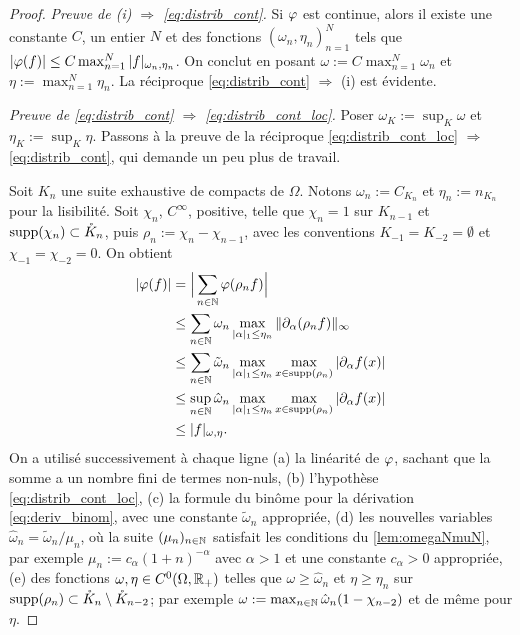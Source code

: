 \begin{proof}
\emph{Preuve de (i) $\Rightarrow$ \eqref{eq:distrib_cont}.}
 Si $\varphi$ est continue, alors il existe  une constante $C$, un entier $N$ et des fonctions $(\omega_n,\eta_n)_{n=1}^N$ tels que $|\varphi(f)|\leq C \max_{n=1}^N |f|_{\omega_n,\eta_n}$. On conclut en posant $\omega := C\max_{n=1}^N \omega_n$ et $\eta := \max_{n=1}^N \eta_n$.
	La réciproque \eqref{eq:distrib_cont} $\Rightarrow$ (i) est évidente. 

\emph{Preuve de \eqref{eq:distrib_cont} $\Rightarrow$ \eqref{eq:distrib_cont_loc}.} Poser $\omega_K := \sup_K \omega$ et $\eta_K:=\sup_K \eta$. Passons à la preuve de la réciproque \eqref{eq:distrib_cont_loc} $\Rightarrow$ \eqref{eq:distrib_cont}, qui demande un peu plus de travail.  

Soit $K_n$ une suite exhaustive de compacts de $\Omega$.	
Notons $\omega_n := C_{K_n}$ et $\eta_n := n_{K_n}$ pour la lisibilité. 	Soit $\chi_n$, $C^\infty$, positive, telle que $\chi_n=1$ sur $K_{n-1}$ et $\operatorname{supp}(\chi_n) \subset \mathring K_n$, puis $\rho_n := \chi_n - \chi_{n-1}$, avec les conventions $K_{-1} = K_{-2} = \emptyset$ et $\chi_{-1} = \chi_{-2} =0$.
	On obtient
	\begin{align*}
		|\vp(f)| &= \Big| \sum_{n \in \bN} \vp(\rho_n f) \Big|\\
		&\leq \sum_{n\in \bN} \omega_n \max_{|\alpha|_1 \leq \eta_n} \|\partial_\alpha (\rho_n f)\|_\infty\\
		&\leq \sum_{n \in \bN} \tilde \omega_n \max_{|\alpha|_1 \leq \eta_n} \max_{x \in \supp(\rho_n) }|\partial_\alpha f(x)|\\
		&\leq \sup_{n \in \bN} \hat \omega_n \max_{|\alpha|_1 \leq \eta_n} %
		\max_{x \in \supp(\rho_n) }|\partial_\alpha f(x)|\\
		& \leq |f|_{\omega,\eta}.
	\end{align*}
	On a utilisé successivement à chaque ligne (a) la linéarité de $\varphi$, sachant que la somme a un nombre fini de termes non-nuls, (b) l'hypothèse \eqref{eq:distrib_cont_loc}, (c) la formule du binôme pour la dérivation \eqref{eq:deriv_binom}, avec une constante $\tilde \omega_n$ appropriée, (d) les nouvelles variables $\hat \omega_n = \tilde \omega_n /\mu_n$, où la suite $(\mu_n)_{n \in \mathbb{N}}$ satisfait les conditions du \cref{lem:omegaNmuN}, par exemple $\mu_n := c_\alpha (1+n)^{-\alpha}$ avec $\alpha>1$ et une constante $c_\alpha>0$ appropriée, (e) des fonctions $\omega,\eta \in C^0(\Omega,\mathbb{R}_+)$ telles que $\omega \geq \hat \omega_n$ et $\eta \geq \eta_n$ sur $\operatorname{supp}(\rho_n)\subset \mathring K_n \setminus \mathring K_{n-2}$; par exemple $\omega := \max_{n\in \mathbb{N}} \hat \omega_n (1-\chi_{n-2})$ et de même pour $\eta$. 
\end{proof}



